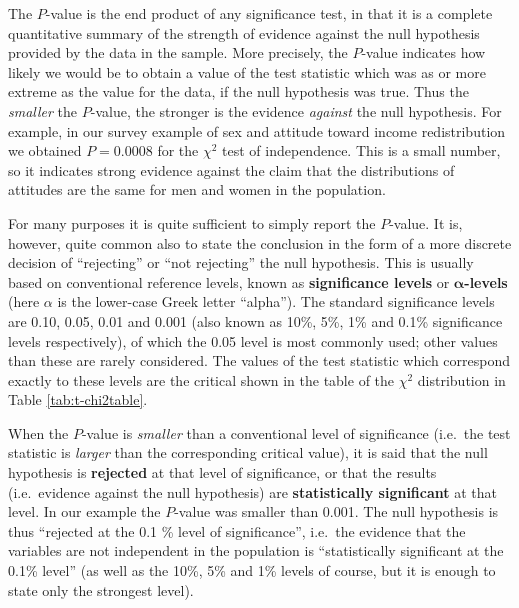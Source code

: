 \documentclass[11pt,a4paper,openany]{book}
\begin{document}
The \(P\)-value is the end product of any significance test, in that it
is a complete quantitative summary of the strength of evidence against
the null hypothesis provided by the data in the sample. More precisely,
the \(P\)-value indicates how likely we would be to obtain a value of
the test statistic which was as or more extreme as the value for the
data, if the null hypothesis was true. Thus the \emph{smaller} the
\(P\)-value, the stronger is the evidence \emph{against} the null
hypothesis. For example, in our survey example of sex and attitude
toward income redistribution we obtained \(P=0.0008\) for the
\(\chi^{2}\) test of independence. This is a small number, so it
indicates strong evidence against the claim that the distributions of
attitudes are the same for men and women in the population.

For many purposes it is quite sufficient to simply report the
\(P\)-value. It is, however, quite common also to state the conclusion
in the form of a more discrete decision of ``rejecting'' or ``not
rejecting'' the null hypothesis. This is usually based on conventional
reference levels, known as \textbf{significance levels} or
\(\boldsymbol{\alpha}\)\textbf{-levels} (here \(\alpha\) is the
lower-case Greek letter ``alpha''). The standard significance levels are
0.10, 0.05, 0.01 and 0.001 (also known as 10\%, 5\%, 1\% and 0.1\%
significance levels respectively), of which the 0.05 level is most
commonly used; other values than these are rarely considered. The values
of the test statistic which correspond exactly to these levels are the
critical shown in the table of the \(\chi^{2}\) distribution in Table
\ref{tab:t-chi2table}.

When the \(P\)-value is \emph{smaller} than a conventional level of
significance (i.e.~the test statistic is \emph{larger} than the
corresponding critical value), it is said that the null hypothesis is
\textbf{rejected} at that level of significance, or that the results
(i.e.~evidence against the null hypothesis) are \textbf{statistically
significant} at that level. In our example the \(P\)-value was smaller
than 0.001. The null hypothesis is thus ``rejected at the 0.1 \% level
of significance'', i.e.~the evidence that the variables are not
independent in the population is ``statistically significant at the
0.1\% level'' (as well as the 10\%, 5\% and 1\% levels of course, but it
is enough to state only the strongest level).
\end{document}
